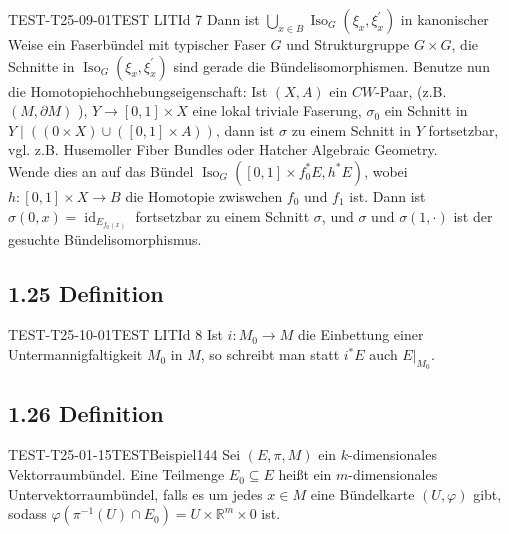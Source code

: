 \begin{EXA}{TEST-T25-09-01}{TEST LITId 7}
Dann ist $\bigcup_{x \in B} \operatorname{Iso}_{G}\left(\xi_{x}, \xi_{x}^{\prime}\right)$ in kanonischer Weise ein Faserbündel mit typischer Faser $G$ und Strukturgruppe $G \times G$, die Schnitte in $\operatorname{Iso}_{G}\left(\xi_{x}, \xi_{x}^{\prime}\right)$ sind gerade die Bündelisomorphismen. Benutze nun die Homotopiehochhebungseigenschaft: Ist $(X, A)$ ein $C W$-Paar, (z.B. $(M, \partial M)$ ), $Y \rightarrow[0,1] \times X$ eine lokal triviale Faserung, $\sigma_{0}$ ein Schnitt in $Y \mid((0 \times X) \cup([0,1] \times A))$, dann ist $\sigma$ zu einem Schnitt in $Y$ fortsetzbar, vgl. z.B. Husemoller Fiber Bundles oder Hatcher Algebraic Geometry.\\
Wende dies an auf das Bündel $\operatorname{Iso}_{G}\left([0,1] \times f_{0}^{*} E, h^{*} E\right)$, wobei $h:[0,1] \times X \rightarrow B$ die Homotopie zwiswchen $f_{0}$ und $f_{1}$ ist. Dann ist $\sigma(0, x)=\operatorname{id}_{E_{f_{0}(x)}}$ fortsetzbar zu einem Schnitt $\sigma$, und $\sigma$ und $\sigma(1, \cdot)$ ist der gesuchte Bündelisomorphismus.
\end{EXA}

\subsection*{1.25 Definition}
\begin{CTypEnum.EXA}{TEST-T25-10-01}{TEST LITId 8}
Ist $i: M_{0} \rightarrow M$ die Einbettung einer Untermannigfaltigkeit $M_{0}$ in $M$, so schreibt man statt $i^{*} E$ auch $\left.E\right|_{M_{0}}$.
\end{CTypEnum.EXA}

\subsection*{1.26 Definition}
\begin{EXA}{TEST-T25-01-15}{TESTBeispiel144}
Sei $(E, \pi, M)$ ein $k$-dimensionales Vektorraumbündel. Eine Teilmenge $E_{0} \subseteq E$ heißt ein $m$-dimensionales Untervektorraumbündel, falls es um jedes $x \in M$ eine Bündelkarte $(U, \varphi)$ gibt, sodass $\varphi\left(\pi^{-1}(U) \cap E_{0}\right)=U \times \mathbb{R}^{m} \times 0$ ist.
\end{EXA}

